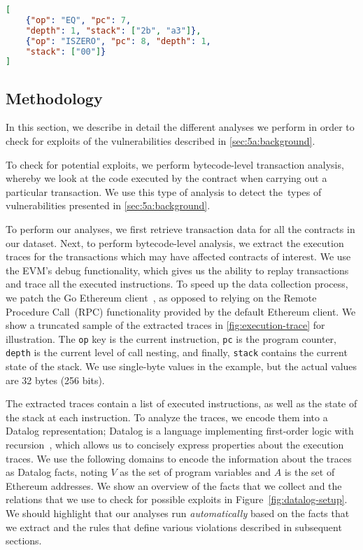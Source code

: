 \begin{lstlisting}[basicstyle=\footnotesize\ttfamily,language=json,float=tb,floatplacement=tb,caption=Sample execution trace information.,label=fig:execution-trace]
[
    {"op": "EQ", "pc": 7, 
    "depth": 1, "stack": ["2b", "a3"]},
    {"op": "ISZERO", "pc": 8, "depth": 1,
    "stack": ["00"]}
]
\end{lstlisting}

\subsection{Methodology}
\label{sec:methodology}

In this section, we describe in detail the different analyses we perform in order to check for exploits of the vulnerabilities described in \autoref{sec:5a:background}.

To check for potential exploits, we perform bytecode-level transaction analysis, whereby we look at the code executed by the contract when carrying out a particular transaction. We use this type of analysis to detect the~\VulnTypes types of vulnerabilities presented in \autoref{sec:5a:background}.

To perform our analyses, we first retrieve transaction data for all the contracts in our dataset. Next, to perform bytecode-level analysis, we extract the execution traces for the transactions which may have affected contracts of interest. We use the EVM's debug functionality, which gives us the ability to replay transactions and trace all the executed instructions. To speed up the data collection process, we patch the Go Ethereum client~\cite{go-ethereum}, as opposed to relying on the Remote Procedure Call~(RPC) functionality provided by the default Ethereum client.
We show a truncated sample of the extracted traces in \autoref{fig:execution-trace} for illustration. 
%
The \lstinline{op} key is the current instruction, \lstinline{pc} is the program counter, \lstinline{depth} is the current level of call nesting, and finally, \lstinline{stack} contains the current state of the stack. We use single-byte values in the example, but the actual values are 32 bytes (256 bits).

The extracted traces contain a list of executed instructions, as well as the state of the stack at each instruction.
To analyze the traces, we encode them into a Datalog representation; Datalog is a language implementing first-order logic with recursion~\cite{Immerman99descriptivecomplexity}, which allows us to concisely express properties about the execution traces.
We use the following domains to encode the information about the traces as Datalog facts, noting $V$ as the set of program variables and $A$ is the set of Ethereum addresses.
We show an overview of the facts that we collect and the relations that we use to check for possible exploits in Figure~\ref{fig:datalog-setup}.
We should highlight that our analyses run \emph{automatically} based on the facts that we extract and the rules that define various violations described in subsequent sections. 

